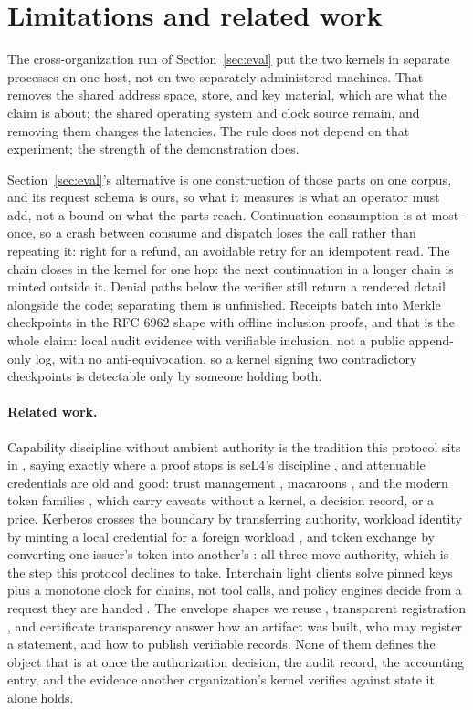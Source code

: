 \section{Limitations and related work}

The cross-organization run of Section~\ref{sec:eval} put the two kernels in
separate processes on one host, not on two separately administered machines.
That removes the shared address space, store, and key material, which are what
the claim is about; the shared operating system and clock source remain, and
removing them changes the latencies. The rule does not depend on that
experiment; the strength of the demonstration does.

Section~\ref{sec:eval}'s alternative is one construction of those parts on one
corpus, and its request schema is ours, so what it measures is what an operator
must add, not a bound on what the parts reach.
Continuation consumption is at-most-once, so a crash between consume and
dispatch loses the call rather than repeating it: right for a refund, an
avoidable retry for an idempotent read. The chain closes in the kernel for one
hop: the next continuation in a longer chain is minted outside it.
Denial paths below the verifier still return a rendered detail alongside the
code; separating them is unfinished. Receipts batch into
Merkle checkpoints in the RFC 6962 shape \cite{rfc6962} with offline inclusion
proofs, and that is the whole claim: local audit evidence with verifiable
inclusion, not a public append-only log, with no anti-equivocation, so a
kernel signing two contradictory checkpoints is detectable only
by someone holding both.

\paragraph{Related work.}
Capability discipline without ambient authority is the tradition this protocol
sits in \cite{saltzer1975,watson2010capsicum}, saying exactly where a proof
stops is seL4's discipline \cite{sel4}, and attenuable credentials are old and
good: trust management \cite{spki,keynote}, macaroons
\cite{macaroons}, and the modern token families \cite{ucan,biscuit}, which carry
caveats without a kernel, a decision record, or a price. Kerberos
\cite{kerberos} crosses the boundary by transferring authority, workload
identity by minting a local credential for a foreign workload \cite{spiffe},
and token exchange by converting one issuer's token into another's
\cite{rfc8693}: all three move authority, which is the step this protocol
declines to take. Interchain light
clients \cite{ibc} solve pinned keys plus a monotone clock for chains, not tool
calls, and policy engines decide from a request they are handed
\cite{cedar}. The envelope shapes we reuse \cite{dsse,intoto},
transparent registration \cite{scitt}, and certificate transparency
\cite{rfc6962} answer how an artifact was built, who may register a statement,
and how to publish verifiable records. None of them defines the object that is
at once the authorization decision, the audit record, the accounting entry, and
the evidence another organization's kernel verifies against state it alone
holds.

